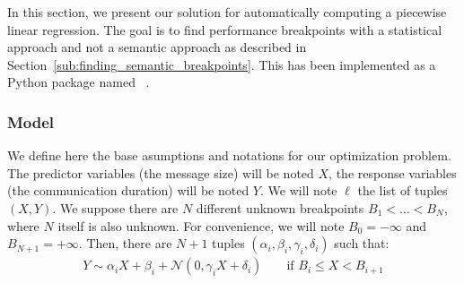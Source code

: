             In this section, we present our solution for automatically computing a piecewise linear regression. The goal
            is to find performance breakpoints with a statistical approach and not a semantic approach as described in
            Section~\ref{sub:finding_semantic_breakpoints}. This has been implemented as a Python package named
            \pyce~\cite{pycewise}.

            \subsubsection{Model}%

                We define here the base asumptions and notations for our optimization problem. The predictor variables
                (\eg the message size) will be noted \(X\), the response variables (\eg the communication duration) will
                be noted \(Y\). We will note \(\ell\) the list of tuples \((X,Y)\). We suppose there are \(N\) different
                unknown breakpoints \(B_1 < \dots < B_N\), where \(N\) itself is also unknown. For convenience, we will
                note \(B_0=-\infty\) and \(B_{N+1} = +\infty\).  Then, there are \(N+1\) tuples \((\alpha_i, \beta_i,
                \gamma_i, \delta_i)\) such that:
                \begin{align}\label{eqn:prediction:pycewise_model}
                    Y \sim \alpha_i X + \beta_i + \mathcal{N}\left(0, \gamma_i X + \delta_i\right)
                        && \text{ if } B_i \leq X < B_{i+1}
                \end{align}

